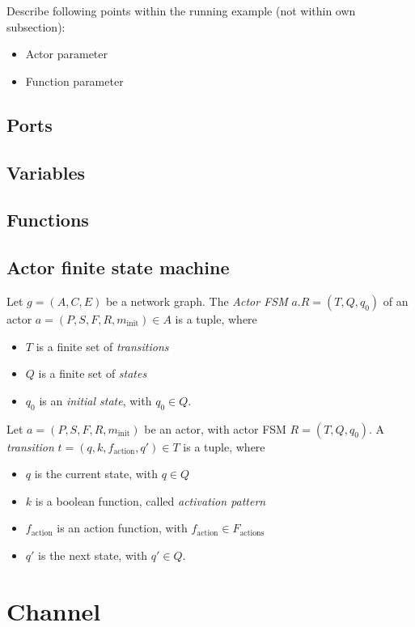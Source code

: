 Describe following points within the running example (not within own subsection):
\begin{itemize}
\item Actor parameter
\item Function parameter
\end{itemize}

\subsection{Ports}

\subsection{Variables}

\subsection{Functions}

\subsection{Actor finite state machine}

\begin{definition}
Let $g=(A,C,E)$ be a network graph.
The \emph{Actor FSM} $a.R=(T,Q,q_0)$ of an actor $a=(P,S,F,R,m_\mathrm{init}) \in A$ is a tuple, where
\begin{itemize}
\item $T$ is a finite set of \emph{transitions}
\item $Q$ is a finite set of \emph{states}
\item $q_0$ is an \emph{initial state}, with $q_0\in Q$.
\end{itemize}
\end{definition}

\begin{definition}[Transition]
Let $a=(P,S,F,R,m_\mathrm{init})$ be an actor, with actor FSM $R=(T,Q,q_0)$.
A \emph{transition} $t=(q,k,f_\mathrm{action},q')\in T$ is a tuple, where
\begin{itemize}
\item $q$ is the current state, with $q \in Q$
\item $k$ is a boolean function, called \emph{activation pattern}
\item $f_\mathrm{action}$ is an action function, with $f_\mathrm{action}\in F_\mathrm{actions}$
\item $q'$ is the next state, with $q' \in Q$.
\end{itemize}
\end{definition}

%
%
\section{Channel \label{sec:channel}}
